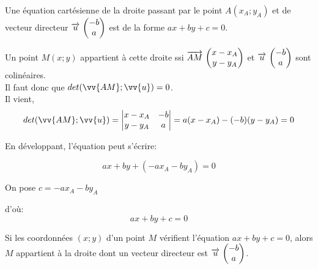 \documentclass[12pt,a4paper]{article}
\begin{document}
\begin{framed}
\vspace{3cm}
\end{framed}
\begin{pro}
Une équation cartésienne de la droite passant par le point $A(x_A;y_A)$ et de vecteur directeur $\overrightarrow{u}\, \begin{pmatrix} -b\\ a \end{pmatrix}$ est de la forme $ax+by+c=0$.
\end{pro}

\begin{pf}
Un point $M(x;y)$ appartient à cette droite ssi $\overrightarrow{AM}\, \begin{pmatrix} x-x_A\\ y-y_A \end{pmatrix}$ et $\overrightarrow{u}\, \begin{pmatrix} -b\\ a \end{pmatrix}$ sont colinéaires.\\
Il faut donc que $det(\vv{AM};\vv{u})=0$.\\
Il vient, $$det(\vv{AM};\vv{u})=\begin{vmatrix} x-x_A & -b \\ y-y_A & a \end{vmatrix}=a(x-x_A)-(-b)(y-y_A)=0$$

En développant, l'équation peut s'écrire:

$$ax+by+(-ax_A-by_A)=0$$

On pose $c=-ax_A-by_A$

d'où: $$\boxed{ax+by+c=0}$$

\end{pf}



\begin{reci}
Si les coordonnées $(x;y)$ d'un point $M$ vérifient l'équation $ax+by+c=0$, alors $M$ appartient à la droite dont un vecteur directeur est $\overrightarrow{u}\, \begin{pmatrix} -b\\ a \end{pmatrix}$.


\end{reci}
\end{document}
